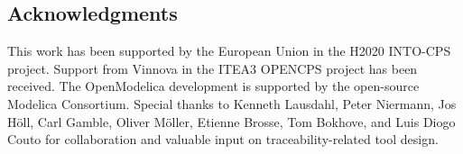 \subsection*{Acknowledgments}
\label{sec:traceabilityacknowledgments}

This work has been supported by the European Union in the H2020 INTO-CPS project. Support from
Vinnova in the ITEA3 OPENCPS project has been received. The OpenModelica development is supported
by the open-source Modelica Consortium. Special thanks to Kenneth Lausdahl, Peter Niermann, Jos H\"{o}ll,
Carl Gamble, Oliver M\"{o}ller, Etienne Brosse, Tom Bokhove, and Luis Diogo Couto for collaboration and
valuable input on traceability-related tool design.






